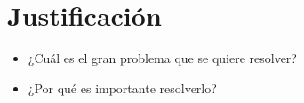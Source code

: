 \section{Justificación}

\begin{tcolorbox}[colback=yellow!10!white,colframe=red!75!black,title=Recomendaciones]
  \begin{itemize}
      \item ¿Cuál es el gran problema que se quiere resolver?
      \item ¿Por qué es importante resolverlo?
  \end{itemize}
\end{tcolorbox}

\pagebreak